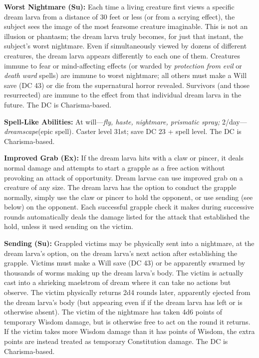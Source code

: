 \documentclass{article}
\begin{document}
\textbf{Worst Nightmare (Su):} Each time a living creature first views a specific 
dream larva from a distance of 30 feet or less (or from a scrying effect), the 
subject sees the image of the most fearsome creature imaginable. This is not an 
illusion or phantasm; the dream larva truly becomes, for just that instant, the 
subject's worst nightmare. Even if simultaneously viewed by dozens of different 
creatures, the dream larva appears differently to each one of them. Creatures immune 
to fear or mind-affecting effects (or warded by \textit{protection from evil }or 
\textit{death ward }spells) are immune to worst nightmare; all others must make 
a Will save (DC 43) or die from the supernatural horror revealed. Survivors (and 
those resurrected) are immune to the effect from that individual dream larva in 
the future. The DC is Charisma-based.

\textbf{Spell-Like Abilities:} At will---\textit{fly, haste, nightmare, prismatic 
spray; }2/day---\textit{dreamscape}(epic spell)\textit{. }Caster level 31st; save 
DC 23 + spell level. The DC is Charisma-based.

\textbf{Improved Grab (Ex): }If the dream larva hits with a claw or pincer, it 
deals normal damage and attempts to start a grapple as a free action without provoking 
an attack of opportunity. Dream larvae can use improved grab on a creature of any 
size. The dream larva has the option to conduct the grapple normally, simply use 
the claw or pincer to hold the opponent, or use sending (see below) on the opponent. 
Each successful grapple check it makes during successive rounds automatically deals 
the damage listed for the attack that established the hold, unless it used sending 
on the victim.

\textbf{Sending (Su):} Grappled victims may be physically sent into a nightmare, 
at the dream larva's option, on the dream larva's next action after establishing 
the grapple. Victims must make a Will save (DC 43) or be apparently swarmed by 
thousands of worms making up the dream larva's body. The victim is actually cast 
into a shrieking maelstrom of dream where it can take no actions but observe. The 
victim physically returns 2d4 rounds later, apparently ejected from the dream larva's 
body (but appearing even if if the dream larva has left or is otherwise absent). 
The victim of the nightmare has taken 4d6 points of temporary Wisdom damage, but 
is otherwise free to act on the round it returns. If the victim takes more Wisdom 
damage than it has points of Wisdom, the extra points are instead treated as temporary 
Constitution damage. The DC is Charisma-based.
\end{document}
